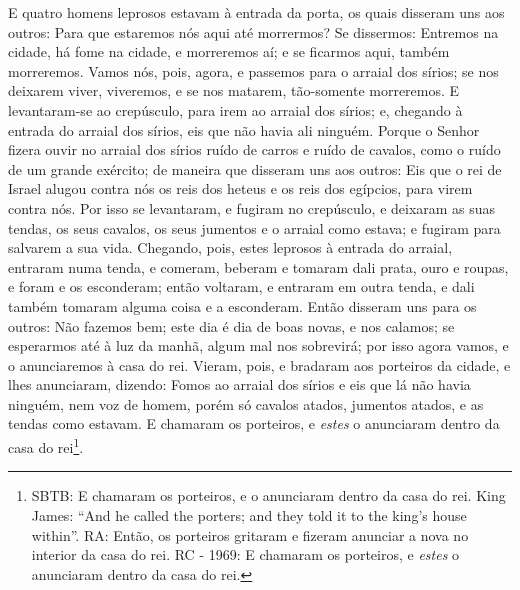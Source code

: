 E quatro homens leprosos estavam à entrada da porta, os quais
disseram uns aos outros: Para que estaremos nós aqui até morrermos?
Se dissermos: Entremos na cidade, há fome na cidade, e
morreremos aí; e se ficarmos aqui, também morreremos. Vamos nós,
pois, agora, e passemos para o arraial dos sírios; se nos deixarem
viver, viveremos, e se nos matarem, tão-somente morreremos. E
levantaram-se ao crepúsculo, para irem ao arraial dos sírios; e,
chegando à entrada do arraial dos sírios, eis que não havia ali
ninguém. Porque o Senhor fizera ouvir no arraial dos sírios
ruído de carros e ruído de cavalos, como o ruído de um grande
exército; de maneira que disseram uns aos outros: Eis que o rei de
Israel alugou contra nós os reis dos heteus e os reis dos egípcios,
para virem contra nós. Por isso se levantaram, e fugiram no
crepúsculo, e deixaram as suas tendas, os seus cavalos, os seus
jumentos e o arraial como estava; e fugiram para salvarem a sua
vida. Chegando, pois, estes leprosos à entrada do arraial,
entraram numa tenda, e comeram, beberam e tomaram dali prata, ouro e
roupas, e foram e os esconderam; então voltaram, e entraram em outra
tenda, e dali também tomaram alguma coisa e a esconderam. Então
disseram uns para os outros: Não fazemos bem; este dia é dia de boas
novas, e nos calamos; se esperarmos até à luz da manhã, algum mal
nos sobrevirá; por isso agora vamos, e o anunciaremos à casa do rei.
Vieram, pois, e bradaram aos porteiros da cidade, e lhes
anunciaram, dizendo: Fomos ao arraial dos sírios e eis que lá não
havia ninguém, nem voz de homem, porém só cavalos atados, jumentos
atados, e as tendas como estavam. E chamaram os porteiros, e
\emph{estes} o anunciaram dentro da casa do rei\footnote{SBTB: E
chamaram os porteiros, e o anunciaram dentro da casa do rei. King
James: ``And he called the porters; and they told it to the king's
house within''. RA: Então, os porteiros gritaram e fizeram anunciar
a nova no interior da casa do rei. RC - 1969: E chamaram os
porteiros, e \emph{estes} o anunciaram dentro da casa do rei.}.

